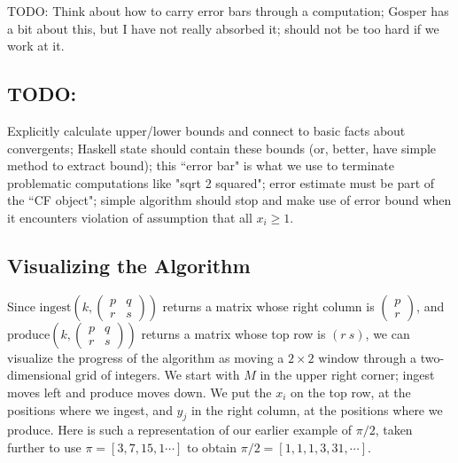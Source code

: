 \documentclass[11pt, oneside]{amsart}   	%
\newcommand{\pqrs}{\left(
\begin{smallmatrix} 
p & q\\ 
r & s 
\end{smallmatrix}
\right)}
\begin{document}

TODO: Think about how to carry error bars through a computation; Gosper has a bit about this, but I have not really absorbed it;
should not be too hard if we work at it.


\subsection{TODO:} Explicitly calculate upper/lower bounds and connect to basic facts about convergents;
Haskell state should contain these bounds
(or, better, have simple method to extract bound); this ``error bar" is what we use to terminate problematic computations
like "sqrt 2 squared"; error estimate must be part of the ``CF object"; simple algorithm should stop and make use of error
bound when it encounters violation of assumption that all $x_i \geq 1$.


\subsection{Visualizing the Algorithm}
Since $\mbox{ingest}(k,\pqrs)$ returns a matrix whose right column is
$\left( \begin{smallmatrix} p \\  r \end{smallmatrix}\right)$,
and $\mbox{produce}(k,\pqrs)$ returns a matrix whose top row is $(r\ s)$, we can visualize the progress of the algorithm as moving a $2 \times 2$ window through a two-dimensional grid of integers.
We start with $M$ in the upper right corner; ingest moves left and produce moves down. We put the $x_i$ on the top row,
at the positions where we ingest, and $y_j$ in the right column, at the positions where we produce. Here is such a representation
of our earlier example of $\pi/2$, taken further to use $\pi = [3,7,15, 1\cdots]$ to obtain $\pi/2 = [1,1,1,3,31,\cdots]$.
\end{document}
